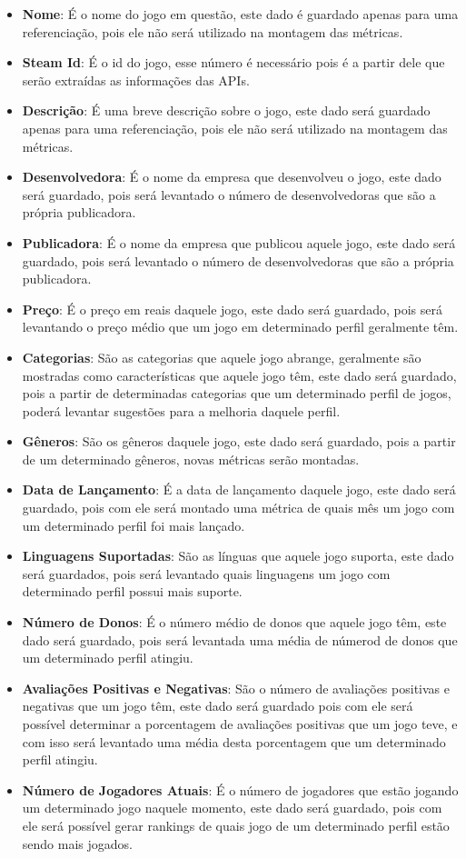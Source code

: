 \begin{itemize}
	\item \textbf{Nome}: É o nome do jogo em questão, este dado é guardado apenas para uma referenciação, pois ele não será utilizado na montagem das métricas.
	\item \textbf{Steam Id}: É o id do jogo, esse número é necessário pois é a partir dele que serão extraídas as informações das APIs.
	\item \textbf{Descrição}: É uma breve descrição sobre o jogo, este dado será guardado apenas para uma referenciação, pois ele não será utilizado na montagem das métricas.
	\item \textbf{Desenvolvedora}: É o nome da empresa que desenvolveu o jogo, este dado será guardado, pois será levantado o número de desenvolvedoras que são a própria publicadora.
	\item \textbf{Publicadora}: É o nome da empresa que publicou aquele jogo, este dado será guardado, pois será levantado o número de desenvolvedoras que são a própria publicadora.
	\item \textbf{Preço}: É o preço em reais daquele jogo, este dado será guardado, pois será levantando o preço médio que um jogo em determinado perfil geralmente têm.
	\item \textbf{Categorias}: São as categorias que aquele jogo abrange, geralmente são mostradas como características que aquele jogo têm, este dado será guardado, pois a partir de determinadas categorias que um determinado perfil de jogos, poderá levantar sugestões para a melhoria daquele perfil.
	\item \textbf{Gêneros}: São os gêneros daquele jogo, este dado será guardado, pois a partir de um determinado gêneros, novas métricas serão montadas.
	\item \textbf{Data de Lançamento}: É a data de lançamento daquele jogo, este dado será guardado, pois com ele será montado uma métrica de quais mês um jogo com um determinado perfil foi mais lançado.
	\item \textbf{Linguagens Suportadas}: São as línguas que aquele jogo suporta, este dado será guardados, pois será levantado quais linguagens um jogo com determinado perfil possui mais suporte.
	\item \textbf{Número de Donos}: É o número médio de donos que aquele jogo têm, este dado será guardado, pois será levantada uma média de númerod de donos que um determinado perfil atingiu.
	\item \textbf{Avaliações Positivas e Negativas}: São o número de avaliações positivas e negativas que um jogo têm, este dado será guardado pois com ele será possível determinar a porcentagem de avaliações positivas que um jogo teve, e com isso será levantado uma média desta porcentagem que um determinado perfil atingiu.
	\item \textbf{Número de Jogadores Atuais}: É o número de jogadores que estão jogando um determinado jogo naquele momento, este dado será guardado, pois com ele será possível gerar rankings de quais jogo de um determinado perfil estão sendo mais jogados.
\end{itemize}
